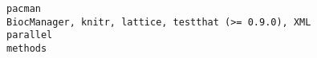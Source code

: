 \documentclass[
  letterpaper,
  DIV=11,
  numbers=noendperiod]{scrreprt}
\begin{document}
\begin{verbatim}
pacman                                                                                                                                                                                                                                                                                                                                                                                                                                                                                                                                                                                                                                                                                                                                                                                                                                                                                                                                                                                                                                                                                                                                                                                                                                                  BiocManager, knitr, lattice, testthat (>= 0.9.0), XML
parallel                                                                                                                                                                                                                                                                                                                                                                                                                                                                                                                                                                                                                                                                                                                                                                                                                                                                                                                                                                                                                                                                                                                                                                                                                                                                                              methods

\end{verbatim}
\end{document}

